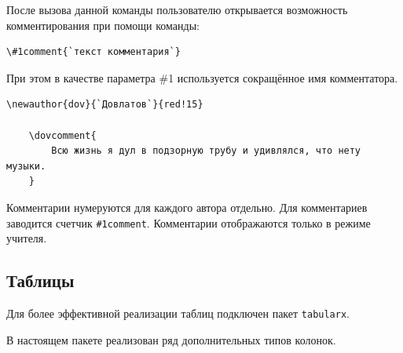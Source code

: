 После вызова данной команды пользователю открывается возможность комментирования при помощи команды:

\begin{lstlisting}[gobble = 3]
    \#1comment{`текст комментария`}
\end{lstlisting}

При этом в качестве параметра \#1 используется сокращённое имя комментатора.


\begin{lstlisting}[gobble = 3]
    \newauthor{dov}{`Довлатов`}{red!15}

    \dovcomment{
        Всю жизнь я дул в подзорную трубу и удивлялся, что нету музыки.
    }
\end{lstlisting}

\vspace{0.2cm}


    
Комментарии нумеруются для каждого автора отдельно. Для комментариев заводится счетчик
\texttt{\#1comment}. Комментарии отображаются только в режиме учителя.




\subsection{Таблицы}
\label{sec:tables}

Для более эффективной реализации таблиц подключен пакет \texttt{tabularx}.


В настоящем пакете реализован ряд дополнительных типов колонок.

\vspace{0.4cm}

